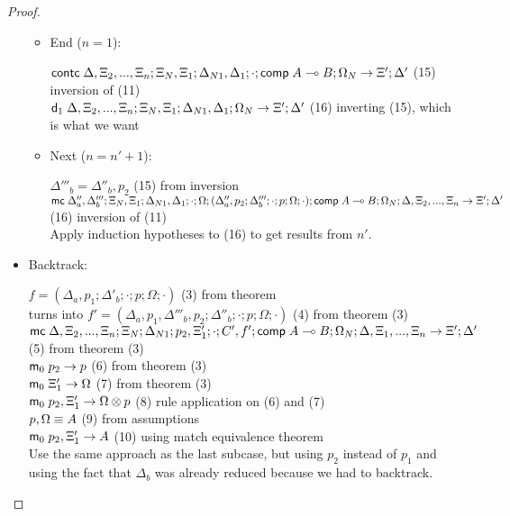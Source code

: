 \begin{proof}
\begin{itemize}
      \begin{itemize}
         \item End ($n = 1$):
         
         $\mathsf{contc} \; \Delta, \Xi_2, ..., \Xi_n; \Xi_N, \Xi_1; \Delta_{N1}, \Delta_1; \cdot; \mathsf{comp} \; A \multimap B; \Omega_N \rightarrow \Xi'; \Delta'$ \hfill (15) \hfill inversion of (11) \\
         $\mathsf{d}_1 \; \Delta, \Xi_2, ..., \Xi_n; \Xi_N, \Xi_1; \Delta_{N1}, \Delta_1; \Omega_N \rightarrow \Xi'; \Delta'$ \hfill (16) inverting (15), which is what we want \\
         
         \item Next ($n = n' + 1$):
         
         $\Delta'''_b = \Delta''_b, p_2$ \hfill (15) from inversion \\
         $\mathsf{mc} \; \Delta''_a, \Delta'''_b; \Xi_N, \Xi_1; \Delta_{N1}, \Delta_1; \cdot; \Omega; (\Delta''_a, p_2; \Delta'''_b; \cdot; p; \Omega; \cdot); \mathsf{comp} \; A \multimap B; \Omega_N; \Delta, \Xi_2, ..., \Xi_n \rightarrow \Xi'; \Delta'$ \hfill (16) inversion of (11) \\
         Apply induction hypotheses to (16) to get results from $n'$.\\ 
      \end{itemize}
      
      \item Backtrack:
      
      $f = (\Delta_a, p_1; \Delta'_b; \cdot; p; \Omega; \cdot)$ \hfill (3) from theorem \\
      turns into $f' = (\Delta_a, p_1, \Delta'''_b, p_2; \Delta''_b; \cdot; p; \Omega; \cdot)$ \hfill (4) from theorem (3) \\
      $\mathsf{mc} \; \Delta, \Xi_2, ..., \Xi_n; \Xi_N; \Delta_{N1}; p_2, \Xi'_1; \cdot; C', f'; \mathsf{comp} \; A \multimap B; \Omega_N; \Delta, \Xi_1, ..., \Xi_n \rightarrow \Xi'; \Delta'$ \hfill (5) from theorem (3) \\
      $\mathsf{m}_0 \; p_2 \rightarrow p$ \hfill (6) from theorem (3) \\
      $\mathsf{m}_0 \; \Xi'_1 \rightarrow \Omega$ \hfill (7) from theorem (3) \\
      $\mathsf{m}_0 \; p_2, \Xi'_1 \rightarrow \Omega \otimes p$ \hfill (8) rule application on (6) and (7) \\
      $p, \Omega \equiv A$ \hfill (9) from assumptions \\
      $\mathsf{m}_0 \; p_2, \Xi'_1 \rightarrow A$ \hfill (10) using match equivalence theorem \\
      
      Use the same approach as the last subcase, but using $p_2$ instead of $p_1$ and using the fact that $\Delta_b$ was already reduced because we had to backtrack.
   \end{itemize}
   
   
\end{proof}

